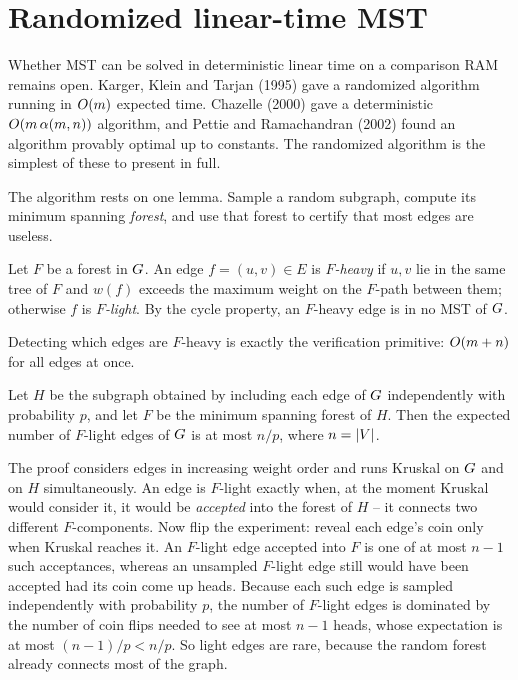 \section{Randomized linear-time MST}
\label{ch06:linear}

Whether MST can be solved in deterministic linear time on a comparison RAM remains open. Karger, Klein and Tarjan (1995) gave a randomized algorithm running in $O(m)$ expected time. Chazelle (2000) gave a deterministic $O(m\,\alpha(m,n))$ algorithm, and Pettie and Ramachandran (2002) found an algorithm provably optimal up to constants. The randomized algorithm is the simplest of these to present in full.

The algorithm rests on one lemma. Sample a random subgraph, compute its minimum spanning \emph{forest}, and use that forest to certify that most edges are useless.

\begin{definition}
Let $F$ be a forest in $G$. An edge $f=(u,v)\in E$ is \emph{$F$-heavy} if $u,v$ lie in the same tree of $F$ and $w(f)$ exceeds the maximum weight on the $F$-path between them; otherwise $f$ is \emph{$F$-light}. By the cycle property, an $F$-heavy edge is in no MST of $G$.
\end{definition}

Detecting which edges are $F$-heavy is exactly the verification primitive: $O(m+n)$ for all edges at once.

\begin{lemma}
\label{ch06:sampling}
Let $H$ be the subgraph obtained by including each edge of $G$ independently with probability $p$, and let $F$ be the minimum spanning forest of $H$. Then the expected number of $F$-light edges of $G$ is at most $n/p$, where $n=\lvert V\rvert$.
\end{lemma}

\begin{whybox}
The proof considers edges in increasing weight order and runs Kruskal on $G$ and on $H$ simultaneously. An edge is $F$-light exactly when, at the moment Kruskal would consider it, it would be \emph{accepted} into the forest of $H$ -- it connects two different $F$-components. Now flip the experiment: reveal each edge's coin only when Kruskal reaches it. An $F$-light edge accepted into $F$ is one of at most $n-1$ such acceptances, whereas an unsampled $F$-light edge still would have been accepted had its coin come up heads. Because each such edge is sampled independently with probability $p$, the number of $F$-light edges is dominated by the number of coin flips needed to see at most $n-1$ heads, whose expectation is at most $(n-1)/p < n/p$. So light edges are rare, because the random forest already connects most of the graph.
\end{whybox}

